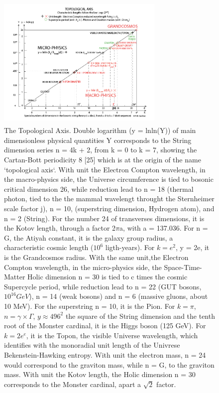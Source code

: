 \documentclass[twoside,draft]{article}
\begin{document}
\begin{sloppypar}
{\begin{figure}
\centering
\includegraphics[width=8cm,height=6.5cm]{./figures/figure}
\caption{The Topological Axis. Double logarithm (y = lnln(Y)) of main dimensionless physical quantities 
Y corresponds to the String dimension series n = 4k + 2, from k = 0 to k = 7, showing the Cartan-Bott
periodicity 8 [25] which is at the origin of the name `topological axis`.
    With unit the Electron Compton wavelength, in the macro-physics side, the Universe circumference 
    is tied to bosonic critical dimension 26, while reduction lead to n = 18 (thermal photon, 
    tied to the the mammal wavelengt throught the Sternheimer scale factor j), n = 10, (superstring 
    dimension, Hydrogen atom), and n = 2 (String). For the number 24 of transverses dimensions, it is
    the Kotov length, through a factor 2$\pi$a, with a = 137.036. For n = G, the Atiyah constant, it is the 
    galaxy group radius, a characteristic cosmic length ($10^{6}$ ligth-years). For $k = e^{2}$, y = 2e, it is 
    the Grandcosmos radius.
    With the same unit,the Electron Compton wavelength, in the micro-physics side, the Space-Time-Matter
    Holic dimension n = 30 is tied to c times the cosmic Supercycle period, while reduction lead to
    n = 22 (GUT bosons, $10^{16} GeV$), n = 14 (weak bosons) and n = 6 (massive gluons, about 10 MeV).
    For the superstring n = 10, it is the Pion.  For $k = \pi$, $n = \gamma \times \Gamma$, $y \approx 496^2$ 
    the square of the String dimension and the tenth root of the Monster cardinal, it is
    the Higgs boson (125 GeV). For $k = 2e^e$, it is the Topon, the visible Universe wavelength,
    which identifies with the monoradial unit length of the Univrese Bekenstein-Hawking entropy.
    With unit the electron mass, n = 24 would correspond to the graviton mass, while n = G, 
    to the graviton mass.
    With unit the Kotov length, the Holic dimension n = 30 corresponds to the Monster cardinal, 
    apart a $\sqrt2$ factor.}
\label{fig:figure_label}
\end{figure}

}
\end{sloppypar}
\end{document}
